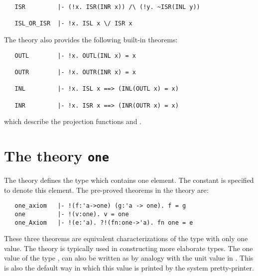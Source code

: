 {\begin{hol}
\begin{verbatim}
   ISR         |- (!x. ISR(INR x)) /\ (!y. ~ISR(INL y))

   ISL_OR_ISR  |- !x. ISL x \/ ISR x
\end{verbatim}\end{hol}

\noindent The  theory also provides the following built-in theorems:

\begin{hol}
\begin{verbatim}
   OUTL        |- !x. OUTL(INL x) = x

   OUTR        |- !x. OUTR(INR x) = x

   INL         |- !x. ISL x ==> (INL(OUTL x) = x)

   INR         |- !x. ISR x ==> (INR(OUTR x) = x)
\end{verbatim}\end{hol}

\noindent which describe the projection functions  and .

\section{The theory {\tt one}}%
%
%

The theory  defines  the type   which  contains one element.
The constant    is specified  to denote  this element.   The pre-proved
theorems in the theory  are:

\begin{hol}
\begin{verbatim}
   one_axiom   |- !(f:'a->one) (g:'a -> one). f = g
   one         |- !(v:one). v = one
   one_Axiom   |- !(e:'a). ?!(fn:one->'a). fn one = e
\end{verbatim}\end{hol}

\noindent These three theorems are equivalent characterizations of the type
with only one value. The theory  is typically used in
constructing more elaborate types.  The one value of the type
, can also be written as \ml{()} by analogy with the unit
value in \ML.  This is also the default way in which this value is
printed by the system pretty-printer.

}

